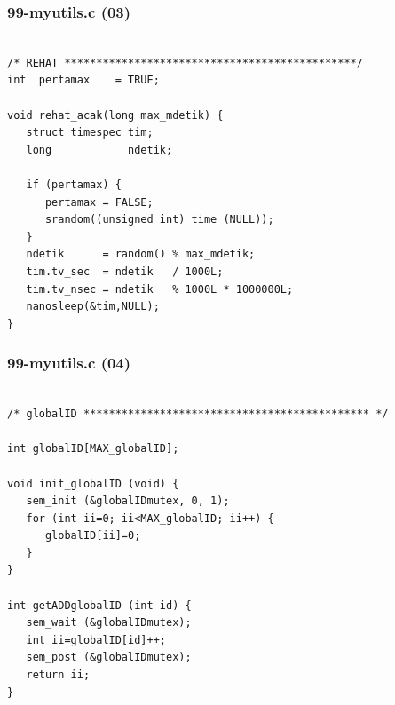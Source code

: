 \documentclass[aspectratio=169, xcolor=table, notheorems, hyperref={pdfpagelabels=false}]{beamer}
\begin{document}
\begin{frame}[fragile]
\frametitle{99-myutils.c (03)}
\begin{lstlisting}[basicstyle=\ttfamily\small]        %  65
% \begin{lstlisting}[basicstyle=\ttfamily\large]        %  54

/* REHAT **********************************************/
int  pertamax    = TRUE;

void rehat_acak(long max_mdetik) {
   struct timespec tim;
   long            ndetik;
  
   if (pertamax) {
      pertamax = FALSE;
      srandom((unsigned int) time (NULL));
   }
   ndetik      = random() % max_mdetik;
   tim.tv_sec  = ndetik   / 1000L;
   tim.tv_nsec = ndetik   % 1000L * 1000000L;
   nanosleep(&tim,NULL);
} 

\end{lstlisting}
\end{frame}

\begin{frame}[fragile]
\frametitle{99-myutils.c (04)}
\begin{lstlisting}[basicstyle=\ttfamily\small]        %  65
% \begin{lstlisting}[basicstyle=\ttfamily\large]        %  54

/* globalID ********************************************* */

int globalID[MAX_globalID];

void init_globalID (void) {
   sem_init (&globalIDmutex, 0, 1);
   for (int ii=0; ii<MAX_globalID; ii++) {
      globalID[ii]=0;
   }
}

int getADDglobalID (int id) {
   sem_wait (&globalIDmutex);
   int ii=globalID[id]++;
   sem_post (&globalIDmutex);
   return ii;
}

\end{lstlisting}
\end{frame}
\end{document}

